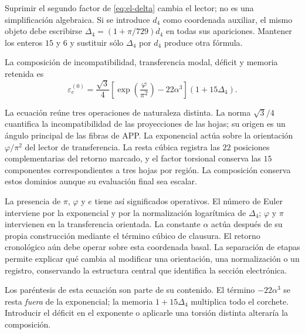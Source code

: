 \begin{remark}
Suprimir el segundo factor de \eqref{eq:el-delta} cambia el lector; no
es una simplificación algebraica. Si se introduce \(d_4\) como
coordenada auxiliar, el mismo objeto debe escribirse
\(\Delta_4=(1+\pi/729)d_4\) en todas sus apariciones. Mantener los
enteros \(15\) y \(6\) y sustituir sólo \(\Delta_4\) por \(d_4\)
produce otra fórmula.
\end{remark}

\begin{definition}
La composición de incompatibilidad, transferencia modal, déficit y memoria retenida
es
\begin{equation}
 \varepsilon_e^{(0)}
 =\frac{\sqrt3}{4}
  \left[\exp\!\left(\frac{\varphi}{\pi^2}\right)-22\alpha^3\right]
  (1+15\Delta_4).
 \label{eq:el-basal}
\end{equation}
\end{definition}

La ecuación reúne tres operaciones de naturaleza distinta. La norma
\(\sqrt3/4\) cuantifica la incompatibilidad de las proyecciones de
las hojas; su origen es un ángulo principal de las fibras de APP.
La exponencial actúa sobre la orientación \(\varphi/\pi^2\) del
lector de transferencia. La resta cúbica registra las \(22\) posiciones
complementarias del retorno marcado, y el factor torsional conserva las
\(15\) componentes correspondientes a tres hojas por región. La
composición conserva estos dominios aunque su evaluación final sea escalar.

La presencia de \(\pi\), \(\varphi\) y \(e\) tiene así significados
operativos. El número de Euler interviene por la exponencial y por
la normalización logarítmica de \(\Delta_4\); \(\varphi\) y \(\pi\)
intervienen en la transferencia orientada. La constante \(\alpha\)
actúa después de su propia construcción mediante el término cúbico
de clausura. El retorno cronológico aún debe operar sobre esta coordenada
basal. La separación de etapas permite explicar qué cambia al modificar
una orientación, una normalización o un registro, conservando la estructura
central que identifica la sección electrónica.

Los paréntesis de esta ecuación son parte de su contenido. El término
\(-22\alpha^3\) se resta \emph{fuera} de la exponencial; la memoria
\(1+15\Delta_4\) multiplica todo el corchete. Introducir el déficit en
el exponente o aplicarle una torsión distinta alteraría la composición.

